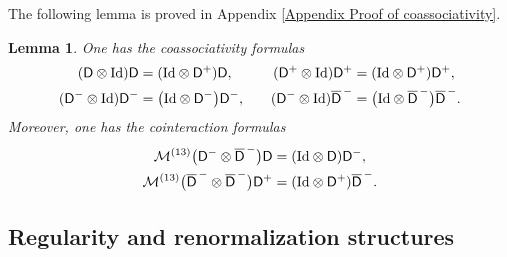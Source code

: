 \documentclass[10pt, reqno]{amsart}
\numberwithin{subsection}{section}
\numberwithin{subsubsection}{subsection}
\numberwithin{equation}{section} %
\theoremstyle{mystyle}
\newtheorem{lem}[thm]{\hspace{-0.14cm}  {Lemma} }%
\theoremstyle{mystyle2}
\theoremstyle{mystyle3}
\newcommand{\ssk}{\smallskip}
\newcommand{\mcM}{\mathcal{M}}
\begin{document}
\ssk

The following lemma is proved in Appendix {\sf \ref{Appendix Proof of coassociativity}}.

\medskip

\begin{lem}\label{coassosictive cointeraction Dpm}
One has the coassociativity formulas
$$
\begin{aligned}
({\sf D}\otimes\text{\rm Id}){\sf D} &= (\text{\rm Id}\otimes {\sf D}^+){\sf D},   
&({\sf D}^+\otimes\text{\rm Id}){\sf D}^+ &= (\text{\rm Id}\otimes {\sf D}^+){\sf D}^+,   \\
({\sf D}^-\otimes\text{\rm Id}){\sf D}^- &= \big(\text{\rm Id}\otimes{\sf D}^-\big){\sf D}^-,   \quad
&({\sf D}^-\otimes\text{\rm Id})\overline{\sf D}^{\,-} &= \big(\text{\rm 
Id}\otimes\overline{\sf D}^{\,-}\big)\overline{\sf D}^{\,-}.
\end{aligned}
$$
Moreover, one has the cointeraction formulas
\begin{align*}
\mcM^{(13)}\big({\sf D}^-\otimes\overline{\sf D}^{\,-}\big){\sf D} &= (\text{\rm Id}\otimes{\sf D}){\sf D}^-,   \\
\mcM^{(13)}\big(\overline{\sf D}^{\,-}\otimes\overline{\sf D}^{\,-}\big){\sf D}^+ &= (\text{\rm Id}\otimes{\sf D}^+)\overline{\sf D}^{\,-}.
\end{align*}
\end{lem}



\bigskip



\subsection{Regularity and renormalization structures}
\label{SectionDecoratedTreesRegRenor}
\end{document}
